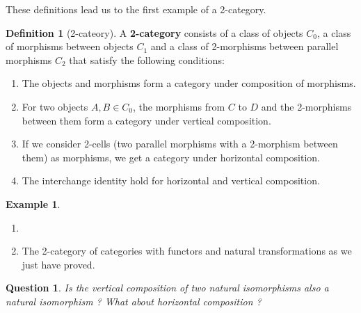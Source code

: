 \documentclass{scrartcl}
\newtheorem{quest}[thm]{Question}
\theoremstyle{definition}
\newtheorem{defn}[thm]{Definition}
\newtheorem{exmp}[thm]{Example}
\theoremstyle{remark}
\begin{document}
These definitions lead us to the first example of a 2-category.
\begin{defn}[2-cateory]
    A \textbf{2-category} consists of a class of objects $C_0$, a class of morphisms between objects $C_1$ and a class of 2-morphisms between parallel morphisms $C_2$ that satisfy the following conditions:
    \begin{enumerate}
        \item The objects and morphisms form a category under composition of morphisms.
        \item For two objects $A,B \in C_0$, the morphisms from $C$ to $D$ and the 2-morphisms between them form a category under vertical composition.
        \item If we consider 2-cells (two parallel morphisms with a 2-morphism between them) as morphisms, we get a category under horizontal composition.
        \item The interchange identity hold for horizontal and vertical composition.
    \end{enumerate}
\end{defn}

\begin{exmp}
    \begin{enumerate}
    \item[]
        \item The 2-category of categories with functors and natural transformations as we just have proved.
    \end{enumerate}
\end{exmp}

\begin{quest}
    Is the vertical composition of two natural isomorphisms also a natural isomorphism ? What about horizontal composition ?
\end{quest}
\end{document}
